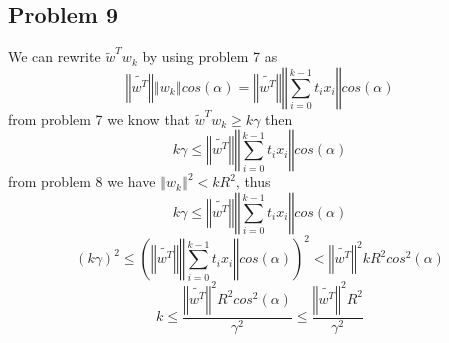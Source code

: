 \subsection*{Problem 9}
We can rewrite $\tilde{w}^{T}w_{k}$ by using problem 7 as 
\[
\left\Vert \tilde{w^{T}}\right\Vert \left\Vert w_{k}\right\Vert
cos(\alpha)=\left\Vert \tilde{w^{T}}\right\Vert \left\Vert
\sum_{i=0}^{k-1}t_{i}x_{i}\right\Vert cos(\alpha)
\]
from problem 7 we know that $\tilde{w}^{T}w_{k}\geq k\gamma$ then
\[
k\gamma\leq\left\Vert \tilde{w^{T}}\right\Vert \left\Vert
\sum_{i=0}^{k-1}t_{i}x_{i}\right\Vert cos(\alpha)
\]
from problem 8 we have $\left\Vert w_{k}\right\Vert ^{2}<kR^{2}$,
thus 
\[
k\gamma\leq\left\Vert \tilde{w^{T}}\right\Vert \left\Vert
\sum_{i=0}^{k-1}t_{i}x_{i}\right\Vert cos(\alpha)
\]
\[
\left(k\gamma\right)^{2}\leq\left(\left\Vert \tilde{w^{T}}\right\Vert
\left\Vert \sum_{i=0}^{k-1}t_{i}x_{i}\right\Vert
cos(\alpha)\right)^{2}<\left\Vert \tilde{w^{T}}\right\Vert
^{2}kR^{2}cos^{2}(\alpha)
\]
\[
k\leq\frac{\left\Vert \tilde{w^{T}}\right\Vert
^{2}R^{2}cos^{2}(\alpha)}{\gamma^{2}}\leq\frac{\left\Vert
\tilde{w^{T}}\right\Vert ^{2}R^{2}}{\gamma^{2}}
\]
  

\newpage
